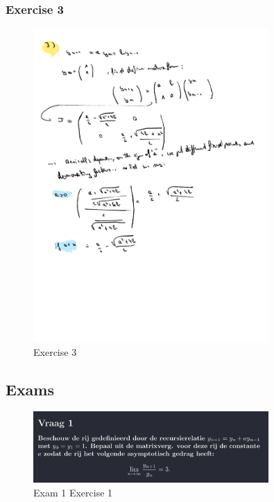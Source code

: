 \documentclass[a4paper]{report}
\begin{document}
\subsubsection{Exercise 3}

\begin{figure}[H]
	\centering
	\includegraphics[width=0.8\textwidth]{assets/wc_3_ex_3.pdf}
	\caption{Exercise 3}
	\label{fig:wc_3_ex_3}
\end{figure}

\subsection{Exams}

\begin{figure}[H]
	\centering
	\includegraphics[width=0.8\textwidth]{assets/exam_1_ex_1.png}
	\caption{Exam 1 Exercise 1}
	\label{fig:exam_1_ex_1}
\end{figure}
\end{document}
